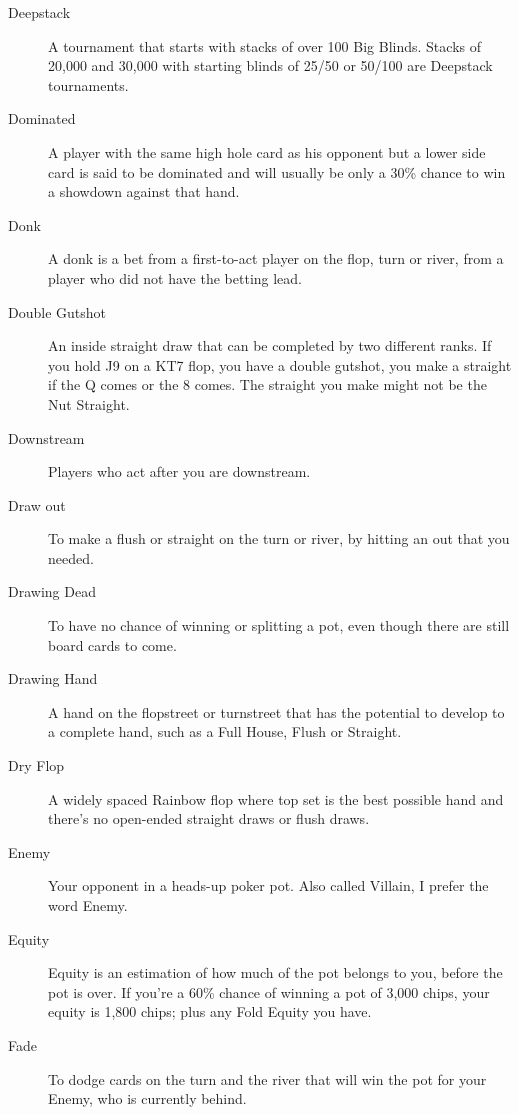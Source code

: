 \begin{description}
\item[Deepstack] A tournament that starts with stacks of over 100 Big
Blinds. Stacks of 20,000 and 30,000 with starting blinds of 25/50 or
50/100 are Deepstack tournaments.

\item[Dominated] A player with the same high hole card as his opponent
but a lower side card is said to be dominated and will usually be
only a 30\% chance to win a showdown against that hand.

\item[Donk] A donk is a bet from a first-to-act player on the flop,
turn or river, from a player who did not have the betting lead.

\item[Double Gutshot] An inside straight draw that can be completed
by two different ranks. If you hold J9 on a KT7 flop, you have a double
gutshot, you make a straight if the Q comes or the 8 comes. The straight
you make might not be the Nut Straight.

\item[Downstream] Players who act after you are downstream.

\item[Draw out] To make a flush or straight on the turn or river, by
hitting an out that you needed.

\item[Drawing Dead] To have no chance of winning or splitting a pot,
even though there are still board cards to come.

\item[Drawing Hand] A hand on the flopstreet or turnstreet that has
the potential to develop to a complete hand, such as a Full House,
Flush or Straight.

\item[Dry Flop] A widely spaced Rainbow flop where top set is the best
possible hand and there's no open-ended straight draws or flush
draws.

\item[Enemy] Your opponent in a heads-up poker pot. Also called
Villain, I prefer the word Enemy.

\item[Equity] Equity is an estimation of how much of the pot belongs
to you, before the pot is over. If you're a 60\% chance of winning a
pot of 3,000 chips, your equity is 1,800 chips; plus any Fold Equity
you have.

\item[Fade] To dodge cards on the turn and the river that will win the
pot for your Enemy, who is currently behind.


\end{description}
